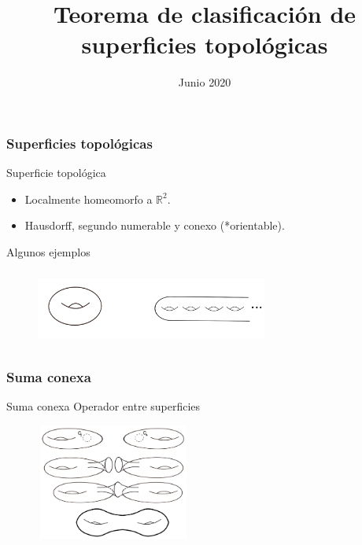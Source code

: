 \documentclass{beamer}
\title[Teorema de clasificación de superficies]{Teorema de clasificación de superficies topológicas}
\author[Rodrigo De Pool]{}
\date[]{Junio 2020}
\begin{document}
\frame{\titlepage}
 
\begin{frame}
\frametitle{Superficies topológicas}

\begin{block}{Superficie topológica}
\begin{itemize}
    \item Localmente homeomorfo a $\mathbb{R}^2$.
    \item Hausdorff, segundo numerable y conexo (*orientable).
\end{itemize}
\end{block}

Algunos ejemplos
\begin{figure}[htb]
\begin{center}
\includegraphics[width=3in,height=1in]{imagenes/diapo1.png} 
\end{center}
\end{figure}

\end{frame}

\begin{frame}
\frametitle{Suma conexa}
\begin{block}{Suma conexa}
Operador entre superficies

\end{block}
\begin{figure}[htb]
\begin{center}
\includegraphics[width=2in,height=1.5in]{imagenes/sumaconexa_toros_R3.png} 
\end{center}
\end{figure}

\end{frame}
\end{document}
